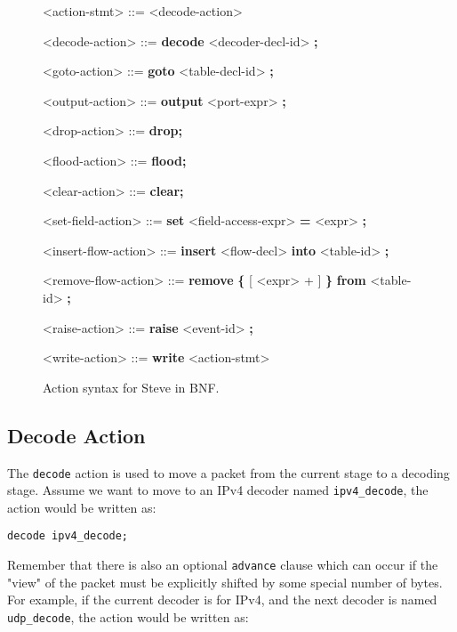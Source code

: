 \begin{figure}
\begin{mdframed}
\begin{grammar}
<action-stmt> ::=
<decode-action>

<decode-action> ::=
\textbf{decode} <decoder-decl-id> \textbf{;}

<goto-action> ::=
\textbf{goto} <table-decl-id> \textbf{;}

<output-action> ::=
\textbf{output} <port-expr> \textbf{;}

<drop-action> ::= \textbf{drop;}

<flood-action> ::= \textbf{flood;}

<clear-action> ::= \textbf{clear;}

<set-field-action> ::= \textbf{set} <field-access-expr> \textbf{=} <expr> \textbf{;}

<insert-flow-action> ::= \textbf{insert} <flow-decl> \textbf{into} <table-id> \textbf{;}

<remove-flow-action> ::= \textbf{remove} \textbf{\{} [ <expr> + ] \textbf{\}}
\textbf{from} <table-id> \textbf{;}

<raise-action> ::= \textbf{raise} <event-id> \textbf{;}

<write-action> ::= \textbf{write} <action-stmt>

\end{grammar}
\end{mdframed}
\caption{Action syntax for Steve in BNF.}
\label{fg:action_syntax}
\end{figure}

\subsection{Decode Action} \label{decode_action_tut}

The \texttt{decode} action is used to move a packet from the current stage to a decoding stage. Assume we want to move to an IPv4 decoder named \texttt{ipv4\_decode}, the action would be written as:

\begin{lstlisting}
decode ipv4_decode;
\end{lstlisting}

Remember that there is also an optional \texttt{advance} clause which can occur if the "view" of the packet must be explicitly shifted by some special number of bytes. For example, if the current decoder is for IPv4, and the next decoder is named \texttt{udp\_decode}, the action would be written as:

